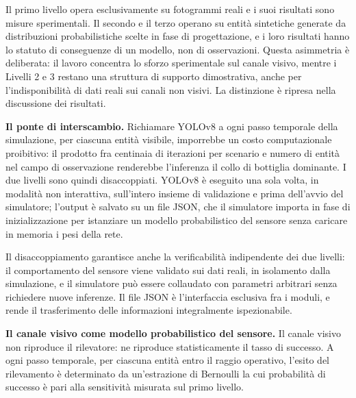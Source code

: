 \ifstampa\documentclass[a4paper,12pt,twoside,openright]{report}\else\documentclass[a4paper,12pt]{report}\fi
\newif\ifrevisione \revisionefalse
\DeclareRobustCommand{\rev}[1]{\ifrevisione{\color{blue!65!black}#1}\else#1\fi}
\begin{document}
Il primo livello opera esclusivamente su fotogrammi reali e i suoi risultati
sono misure sperimentali. Il secondo e il terzo operano su entità
sintetiche generate da distribuzioni \rev{probabilistiche} scelte in fase di progettazione, e i loro
risultati hanno lo statuto di conseguenze di un modello, non di osservazioni.
Questa asimmetria è deliberata\rev{: il lavoro concentra lo sforzo sperimentale sul
canale visivo, mentre i Livelli 2 e 3 restano una struttura di supporto
dimostrativa, anche per l'indisponibilità di dati reali sui canali non visivi. La distinzione è ripresa}
nella discussione dei risultati.

\textbf{Il ponte di interscambio.}
\rev{Richiamare YOLOv8 a ogni passo temporale della simulazione, per ciascuna
entità visibile, imporrebbe un costo computazionale proibitivo: il prodotto fra
centinaia di iterazioni per scenario e numero di entità nel campo di
osservazione renderebbe l'inferenza il collo di bottiglia dominante. I due
livelli sono quindi disaccoppiati. YOLOv8 è eseguito una sola volta, in
modalità non interattiva, sull'intero insieme di validazione e prima
dell'avvio del simulatore; l'output è salvato su un file JSON, che il
simulatore importa in fase di inizializzazione per istanziare un modello
probabilistico del sensore senza caricare in memoria i pesi della rete.}

Il disaccoppiamento garantisce anche la verificabilità indipendente dei due
livelli: il comportamento del sensore viene validato sui dati reali, in
isolamento dalla simulazione, e il simulatore può essere collaudato con
parametri arbitrari senza richiedere nuove inferenze. Il file JSON è l'interfaccia
esclusiva fra i moduli, e rende il trasferimento delle informazioni
integralmente ispezionabile.

\textbf{Il canale visivo come modello probabilistico del sensore.}
\label{sec:canale_visivo}
Il canale visivo non riproduce il rilevatore: ne riproduce statisticamente il
tasso di successo. A ogni passo temporale, per ciascuna entità entro il raggio
operativo, l'esito del rilevamento è determinato da un'estrazione di Bernoulli
la cui probabilità di successo è pari alla \rev{sensitività} misurata sul primo
livello.
\end{document}
